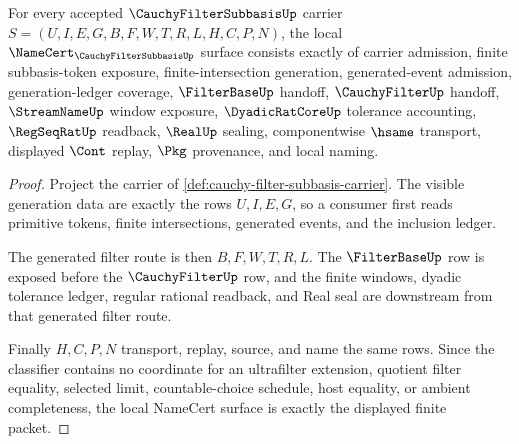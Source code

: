 \begin{theorem}
\label{thm:cauchy-filter-subbasis-namecert-obligations}
For every accepted $\CauchyFilterSubbasisUp$ carrier $S=(U,I,E,G,B,F,W,T,R,L,H,C,P,N)$, the local $\NameCert_{\CauchyFilterSubbasisUp}$ surface consists exactly of carrier admission, finite subbasis-token exposure, finite-intersection generation, generated-event admission, generation-ledger coverage, $\FilterBaseUp$ handoff, $\CauchyFilterUp$ handoff, $\StreamNameUp$ window exposure, $\DyadicRatCoreUp$ tolerance accounting, $\RegSeqRatUp$ readback, $\RealUp$ sealing, componentwise $\hsame$ transport, displayed $\Cont$ replay, $\Pkg$ provenance, and local naming.
\end{theorem}
\begin{proof}
Project the carrier of \autoref{def:cauchy-filter-subbasis-carrier}. The visible generation data are exactly the rows $U,I,E,G$, so a consumer first reads primitive tokens, finite intersections, generated events, and the inclusion ledger.

The generated filter route is then $B,F,W,T,R,L$. The $\FilterBaseUp$ row is exposed before the $\CauchyFilterUp$ row, and the finite windows, dyadic tolerance ledger, regular rational readback, and Real seal are downstream from that generated filter route.

Finally $H,C,P,N$ transport, replay, source, and name the same rows. Since the classifier contains no coordinate for an ultrafilter extension, quotient filter equality, selected limit, countable-choice schedule, host equality, or ambient completeness, the local NameCert surface is exactly the displayed finite packet.
\end{proof}

